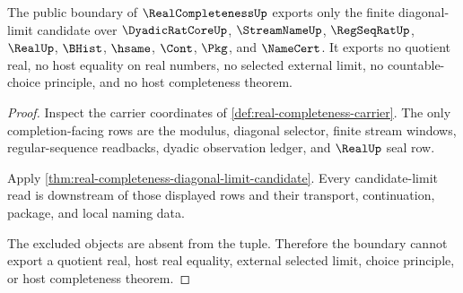 \begin{theorem}
\label{thm:real-completeness-nonescape-boundary}
The public boundary of $\RealCompletenessUp$ exports only the finite diagonal-limit candidate over $\DyadicRatCoreUp$, $\StreamNameUp$, $\RegSeqRatUp$, $\RealUp$, $\BHist$, $\hsame$, $\Cont$, $\Pkg$, and $\NameCert$. It exports no quotient real, no host equality on real numbers, no selected external limit, no countable-choice principle, and no host completeness theorem.
\end{theorem}
\begin{proof}
Inspect the carrier coordinates of \autoref{def:real-completeness-carrier}. The only completion-facing rows are the modulus, diagonal selector, finite stream windows, regular-sequence readbacks, dyadic observation ledger, and $\RealUp$ seal row.

Apply \autoref{thm:real-completeness-diagonal-limit-candidate}. Every candidate-limit read is downstream of those displayed rows and their transport, continuation, package, and local naming data.

The excluded objects are absent from the tuple. Therefore the boundary cannot export a quotient real, host real equality, external selected limit, choice principle, or host completeness theorem.
\end{proof}

